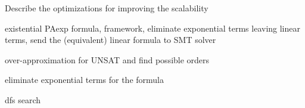 
Describe the optimizations for improving the scalability

existential PAexp formula, framework, eliminate exponential terms leaving linear terms, send the (equivalent) linear formula to SMT solver

over-approximation for UNSAT and find possible orders

eliminate exponential terms for the formula

dfs search



